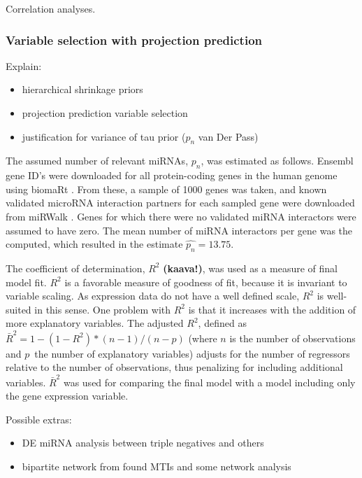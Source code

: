 Correlation analyses.


\subsubsection{Variable selection with projection prediction}

Explain:
\begin{itemize}
  \item hierarchical shrinkage priors
  \item projection prediction variable selection
  \item justification for variance of tau prior ($p_n$ van Der Pass)
\end{itemize}

The assumed number of relevant miRNAs, $p_n$, was estimated as follows.
Ensembl gene ID's were downloaded for all protein-coding genes in the human
genome using biomaRt \citep{biomaRt}. From these, a sample of 1000 genes was
taken, and known validated microRNA interaction partners for each sampled gene
were downloaded from miRWalk \citep{Dweep2015}. Genes for which there were no
validated miRNA interactors were assumed to have zero. The mean number of
miRNA interactors per gene was the computed, which resulted in the estimate
$\hat{p_n} = 13.75$.

The coefficient of determination, $R^2$ \textbf{(kaava!)}, was used as a measure of final model
fit. $R^2$ is a favorable measure of goodness of fit, because it is invariant
to variable scaling. As expression data do not have a well defined scale,
$R^2$ is well-suited in this sense. One problem with $R^2$ is that it
increases with the addition of more explanatory variables. The adjusted $R^2$,
defined as $\bar{R}^2 = 1-(1-R^2)*(n-1)/(n-p)$ (where $n$ is the number of
observations and $p$ the number of explanatory variables) adjusts for the
number of regressors relative to the number of observations, thus penalizing
for including additional variables. $\bar{R}^2$ was used for comparing the
final model with a model including only the gene expression variable.

Possible extras:
\begin{itemize}
	\item DE miRNA analysis between triple negatives and others
	\item bipartite network from found MTIs and some network analysis
\end{itemize}
